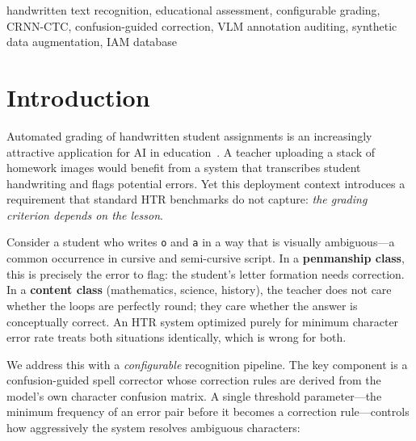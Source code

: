 \documentclass[conference]{IEEEtran}
\begin{document}
\begin{abstract}
We further characterize how training data choices affect the recognition backbone: a 14-run hyperparameter search achieves 6.29\% validation CER ($-$30\% relative); targeted synthetic augmentation with LLM-generated rare-character text reduces greedy test CER to 7.52\% at $10\times$ scale; and an ``anchor effect'' is identified where synthetic augmentation becomes counter-productive if the real-data base set falls below $\sim$5,000 samples.
\end{abstract}

\begin{IEEEkeywords}
handwritten text recognition, educational assessment, configurable grading, CRNN-CTC, confusion-guided correction, VLM annotation auditing, synthetic data augmentation, IAM database
\end{IEEEkeywords}

\section{Introduction}

Automated grading of handwritten student assignments is an increasingly attractive application for AI in education~\cite{gao2023}. A teacher uploading a stack of homework images would benefit from a system that transcribes student handwriting and flags potential errors. Yet this deployment context introduces a requirement that standard HTR benchmarks do not capture: \emph{the grading criterion depends on the lesson}.

Consider a student who writes \texttt{o} and \texttt{a} in a way that is visually ambiguous---a common occurrence in cursive and semi-cursive script. In a \textbf{penmanship class}, this is precisely the error to flag: the student's letter formation needs correction. In a \textbf{content class} (mathematics, science, history), the teacher does not care whether the loops are perfectly round; they care whether the answer is conceptually correct. An HTR system optimized purely for minimum character error rate treats both situations identically, which is wrong for both.

We address this with a \emph{configurable} recognition pipeline. The key component is a confusion-guided spell corrector whose correction rules are derived from the model's own character confusion matrix. A single threshold parameter---the minimum frequency of an error pair before it becomes a correction rule---controls how aggressively the system resolves ambiguous characters:
\end{document}
